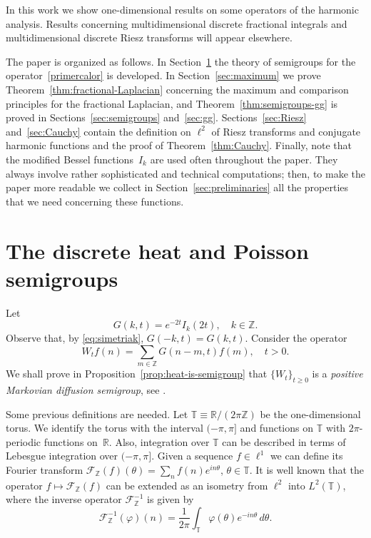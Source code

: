 \documentclass[11pt]{amsart}
\numberwithin{equation}{section}
\newcommand{\Z}{\mathbb{Z}}
\newcommand{\R}{\mathbb{R}}
\newcommand{\T}{\mathbb{T}}
\theoremstyle{plain}
\theoremstyle{remark}
\begin{document}
In this work we show one-dimensional results on some operators of the harmonic analysis. Results concerning multidimensional discrete fractional integrals and multidimensional discrete Riesz transforms will appear elsewhere.



The paper is organized as follows. In Section~\ref{sec:disheatsemigroup} the theory of semigroups for the operator~\eqref{primercalor} is developed. In Section~\ref{sec:maximum} we prove Theorem~\ref{thm:fractional-Laplacian} concerning the maximum and comparison principles for the fractional Laplacian, and Theorem~\ref{thm:semigroups-gg} is proved in Sections~\ref{sec:semigroups} and~\ref{sec:gg}. Sections~\ref{sec:Riesz} and~\ref{sec:Cauchy} contain the definition on $\ell^2$ of Riesz transforms and conjugate harmonic functions and the proof of Theorem~\ref{thm:Cauchy}. Finally, note that the modified Bessel functions~$I_k$ are used often throughout the paper. They always involve rather sophisticated and technical computations; then, to make the paper more readable we collect in Section~\ref{sec:preliminaries} all the properties that we need concerning these functions.

\section{The discrete heat and Poisson semigroups}
\label{sec:disheatsemigroup}

Let
\begin{equation}
\label{eq:heatkernel}
  G(k,t) = e^{-2t} I_{k}(2t), \quad  k \in \Z.
\end{equation}
Observe that, by \eqref{eq:simetriak}, $G(-k,t) = G(k,t)$. Consider  the operator
\begin{equation}
\label{eq:heatconv}
  W_tf(n) = \sum_{m\in\Z} G(n-m,t) f(m), \quad t>0.
\end{equation}
We shall prove in Proposition~\ref{prop:heat-is-semigroup} that $\{W_t\}_{t \ge 0}$ is a \textit{positive Markovian diffusion semigroup}, see \cite[Chapter 3, p.~65]{St-rojo}.

Some previous definitions are needed. Let $\T\equiv\R/(2\pi\Z)$ be the one-dimensional torus. We identify the torus with the interval $(-\pi,\pi]$ and functions on $\T$ with $2\pi$-periodic functions on~$\R$. Also, integration over $\T$ can be described in terms of Lebesgue integration over $(-\pi,\pi]$.
Given a sequence $f \in \ell^1$ we can define its Fourier transform $\mathcal{F}_{\Z}(f)(\theta)= \sum_n  f(n) e^{in\theta}$, $\theta \in \T$.
It is well known that the operator $f \mapsto \mathcal{F}_{\Z}(f)$ can be extended as an isometry from $\ell^2$ into $L^2(\T)$, where the inverse operator $ \mathcal{F}_{\Z}^{-1}$ is given by
\begin{equation}\label{inversion}
\mathcal{F}_\Z^{-1}(\varphi)(n) = \frac1{2\pi}\int_{\T} \varphi(\theta) e^{-in\theta} \,d\theta.
\end{equation}
\end{document}
